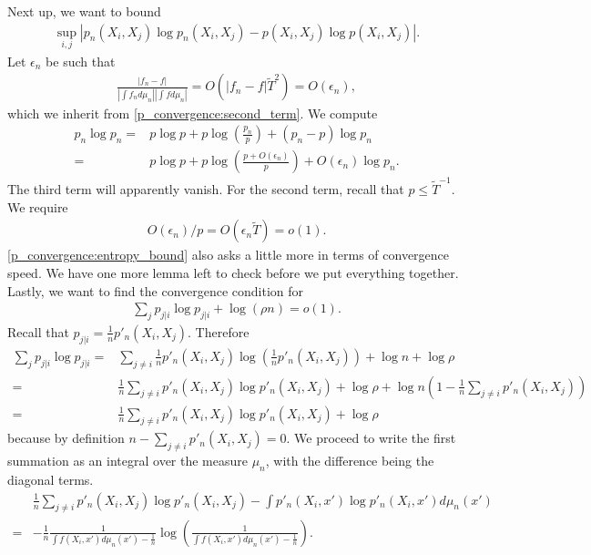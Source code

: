 \documentclass[10pt]{article}
\begin{document}
Next up, we want to bound
\begin{align}
  \sup_{i,j}|p_n(X_i,X_j)\log p_n(X_i,X_j) - p(X_i,X_j)\log p(X_i,X_j)|.
\end{align}
Let $\epsilon_n$ be such that
\begin{align}
  \frac{|f_n-f|}{|\int f_n d\mu_n||\int f d\mu_n|} = O(|f_n-f|\tilde{T}^2) = O(\epsilon_n),
\end{align}
which we inherit from \eqref{p_convergence:second_term}. We compute
\begin{align}
  p_n \log p_n = & p \log p + p \log \left(\frac{p_n}{p}\right) + (p_n-p)\log p_n \nonumber           \\
  =              & p \log p + p \log \left(\frac{p+ O(\epsilon_n)}{p}\right) + O(\epsilon_n)\log p_n.
\end{align}
The third term will apparently vanish. For the second term, recall that $p \leq \tilde{T}^{-1}$. We require
\begin{align} \label{p_convergence:entropy_bound}
  O(\epsilon_n)/p = O(\epsilon_n \tilde{T}) = o(1).
\end{align}
\eqref{p_convergence:entropy_bound} also asks a little more in terms of convergence speed. We have one more lemma left to check before we put everything together. Lastly, we want to find the convergence condition for
\begin{align}
  \sum_j p_{j|i} \log p_{j|i} + \log(\rho n) = o(1).
\end{align}
Recall that $p_{j|i} = \frac{1}{n}p'_n(X_i,X_j)$. Therefore
\begin{align}
  \sum_j p_{j|i} \log p_{j|i} = & \sum_{j \neq i} \frac{1}{n}p'_n(X_i,X_j) \log \left(\frac{1}{n}p'_n(X_i,X_j) \right ) + \log n + \log \rho \nonumber                                  \\
  =                             & \frac{1}{n} \sum_{j \neq i} p'_n(X_i,X_j) \log p'_n(X_i,X_j) + \log \rho + \log n \left(1 - \frac{1}{n}\sum_{j \neq i} p'_n(X_i,X_j)\right) \nonumber \\
  =                             & \frac{1}{n} \sum_{j \neq i} p'_n(X_i,X_j) \log p'_n(X_i,X_j) + \log \rho
\end{align}
because by definition $n - \sum_{j \neq i} p'_n(X_i,X_j) = 0$. We proceed to write the first summation as an integral over the measure $\mu_n$, with the difference being the diagonal terms.
\begin{align} \label{p_convergence:diagonal_term}
    & \frac{1}{n} \sum_{j \neq i} p'_n(X_i,X_j) \log p'_n(X_i,X_j) - \int p'_n(X_i,x') \log p'_n(X_i,x') d\mu_n(x') \nonumber     \\
  = & -\frac{1}{n}\frac{1}{\int f(X_i,x')d\mu_n(x')-\frac{1}{n}}\log \left(\frac{1}{\int f(X_i,x')d\mu_n(x')-\frac{1}{n}}\right).
\end{align}
\end{document}
